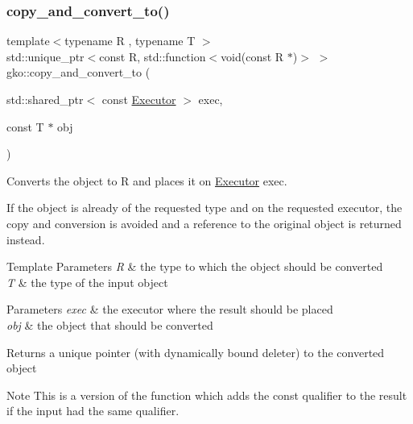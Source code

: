 \subsubsection{\texorpdfstring{copy\+\_\+and\+\_\+convert\+\_\+to()}{copy\_and\_convert\_to()}\hspace{0.1cm}{\footnotesize\ttfamily [2/4]}}
{\footnotesize\ttfamily template$<$typename R , typename T $>$ \\
std\+::unique\+\_\+ptr$<$const R, std\+::function$<$void(const R $\ast$)$>$ $>$ gko\+::copy\+\_\+and\+\_\+convert\+\_\+to (\begin{DoxyParamCaption}\item[{std\+::shared\+\_\+ptr$<$ const \hyperlink{classgko_1_1Executor}{Executor} $>$}]{exec,  }\item[{const T $\ast$}]{obj }\end{DoxyParamCaption})}



Converts the object to R and places it on \hyperlink{classgko_1_1Executor}{Executor} exec. 

If the object is already of the requested type and on the requested executor, the copy and conversion is avoided and a reference to the original object is returned instead.


\begin{DoxyTemplParams}{Template Parameters}
{\em R} & the type to which the object should be converted \\
\hline
{\em T} & the type of the input object\\
\hline
\end{DoxyTemplParams}

\begin{DoxyParams}{Parameters}
{\em exec} & the executor where the result should be placed \\
\hline
{\em obj} & the object that should be converted\\
\hline
\end{DoxyParams}
\begin{DoxyReturn}{Returns}
a unique pointer (with dynamically bound deleter) to the converted object
\end{DoxyReturn}
\begin{DoxyNote}{Note}
This is a version of the function which adds the const qualifier to the result if the input had the same qualifier. 
\end{DoxyNote}
\mbox{\label{namespacegko_ac2b925f8d9f288210c7d1f0e00e5c495}} 
